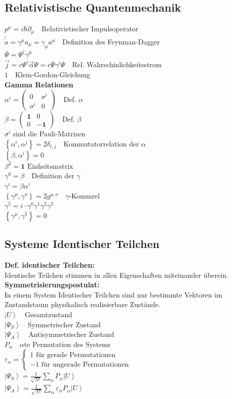\documentclass[8pt,a4paper]{extarticle}
\newcommand{\frml}[2]{$#1$~\hfill~#2\\}
\newcommand{\ket}[1]{\left|#1\right\rangle}
\begin{document}
\begin{multicols}{3}
\subsection{Relativistische Quantenmechanik}
\frml{p^\mu = i\hbar \partial_\mu}{Relativistischer Impulsoperator}
\frml{\not{a} = \gamma^\mu a_\mu = \gamma_\mu a^\mu}{Definition des Feynman-Dagger}
\frml{\overline{\Psi} = \Psi^\dagger \gamma^0}{}
\frml{\vec{j} = c \Psi^\dagger \vec{\alpha} \Psi = c \overline{\Psi} \gamma^i \Psi}{Rel. Wahrschinlichkeitsstrom}
\frml{1}{Klein-Gordon-Gleichung}
\textbf{Gamma Relationen}\\
\frml{\alpha^i = \begin{pmatrix} 0 & \sigma^i \\ \sigma^i & 0 \end{pmatrix}}{Def. $\alpha$}
\frml{\beta = \begin{pmatrix} \mathbf{1} & 0 \\ 0 & -\mathbf{1} \end{pmatrix}}{Def. $\beta$}
$\sigma^i$ sind die Pauli-Matrizen \\
\frml{\left\{\alpha^i,\alpha^j\right\} = 2\delta_{i,j}}{Kommutatorrelation der $\alpha$}
\frml{\left\{\beta, \alpha^i\right\} = 0}{}
\frml{\beta^2 = \mathbf{1} \text{  Einheitsmatrix}}{}
\frml{\gamma^0 = \beta}{Definition der $\gamma$}
\frml{\gamma^i = \beta\alpha^i}{}
\frml{\left\{\gamma^\mu,\gamma^\nu \right\} = 2g^{\mu,\nu}}{$\gamma$-Kommrel}
\frml{\gamma^5 = i\cdot \gamma^0\gamma^1\gamma^2\gamma^3}{}
\frml{\left\{\gamma^\mu, \gamma^5\right\} = 0}{}
\subsection{Systeme Identischer Teilchen}
\textbf{Def. identischer Teilchen:}\\
Identische Teilchen stimmen in allen Eigenschaften miteinander \"uberein.\\
\textbf{Symmetrisierungspostulat:}\\
In einem System Identischer Teilchen sind nur bestimmte Vektoren im Zustandstaum physikalisch realisierbare Zust\"ande.\\
\frml{\ket{U}}{Gesamtzustand}
\frml{\ket{\Psi_S}}{Symmetrischer Zustand}
\frml{\ket{\Psi_A}}{Antisymmetrischer Zustand}
\frml{P_\alpha}{$\alpha$te Permutation des Systems}
\frml{\varepsilon_\alpha = \begin{cases} 1 \text{ f\"ur gerade Permutationen} \\ -1 \text{ f\"ur ungerade Permutationen} \end{cases}}{}
\frml{\ket{\Psi_S} = \frac{1}{\sqrt{N!}} \sum_\alpha P_\alpha \ket{U}}{}
\frml{\ket{\Psi_A} = \frac{1}{\sqrt{N!}} \sum_\alpha \varepsilon_\alpha P_\alpha \ket{U}}{}


\end{multicols}
\end{document}
